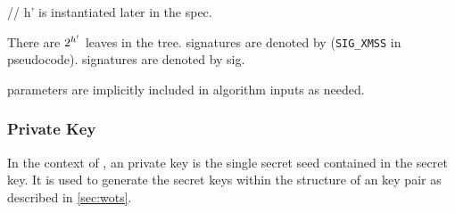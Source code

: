 \begin{code}
  // h' is instantiated later in the spec.
\end{code}

There are $2^{h'}$ leaves in the tree.
\xmss signatures are denoted by \xmsssig (\texttt{SIG\_XMSS} in pseudocode). 
\wotsp signatures are denoted by sig.

\xmss parameters are implicitly included in algorithm
inputs as needed.

% 
% 
% 
% 

\subsubsection{\xmss Private Key}
In the context of \spx, an \xmss private key is the single secret seed \sseed
contained in the \spx secret key. It is used to generate the \wotsp secret keys 
within the structure of an \xmss key pair as described in \autoref{sec:wots}.


